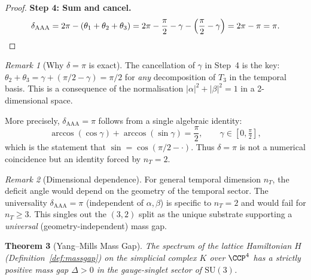 \documentclass[12pt]{article}
\newtheorem{theorem}{Theorem}[section]
\theoremstyle{remark}
\newtheorem{remark}[theorem]{Remark}
\theoremstyle{definition}
\begin{document}
\begin{proof}
\medskip\noindent
\textbf{Step 4: Sum and cancel.}
\begin{equation}
\delta_{\mathrm{AAA}} = 2\pi - (\theta_1 + \theta_2 + \theta_3)
= 2\pi - \frac{\pi}{2} - \gamma - \Bigl(\frac{\pi}{2} - \gamma\Bigr)
= 2\pi - \pi = \pi. \qedhere
\end{equation}
\end{proof}

\begin{remark}[Why $\delta = \pi$ is exact]
The cancellation of $\gamma$ in Step~4 is the key: $\theta_2 + \theta_3
= \gamma + (\pi/2 - \gamma) = \pi/2$ for \emph{any} decomposition of
$T_3$ in the temporal basis.  This is a consequence of the normalisation
$|\alpha|^2 + |\beta|^2 = 1$ in a 2-dimensional space.

More precisely, $\delta_{\mathrm{AAA}} = \pi$ follows from a single
algebraic identity:
\begin{equation}
\arccos(\cos\gamma) + \arccos(\sin\gamma) = \frac{\pi}{2},
\qquad \gamma \in [0, \tfrac{\pi}{2}],
\end{equation}
which is the statement that $\sin = \cos(\pi/2 - \cdot)$.  Thus
$\delta = \pi$ is not a numerical coincidence but an identity forced by
$n_T = 2$.
\end{remark}

\begin{remark}[Dimensional dependence]
For general temporal dimension $n_T$, the deficit angle would depend on
the geometry of the temporal sector. The universality
$\delta_{\mathrm{AAA}} = \pi$ (independent of $\alpha, \beta$) is
specific to $n_T = 2$ and would fail for $n_T \geq 3$.  This
singles out the $(3,2)$ split as the unique substrate supporting a
\emph{universal} (geometry-independent) mass gap.
\end{remark}

\begin{theorem}[Yang--Mills Mass Gap]
\label{thm:massgap}
The spectrum of the lattice Hamiltonian $H$
(Definition~\ref{def:massgap}) on the simplicial complex $K$
over $\CCP^4$ has a strictly positive mass gap $\Delta > 0$
in the gauge-singlet sector of $\mathrm{SU}(3)$.
\end{theorem}
\end{document}
